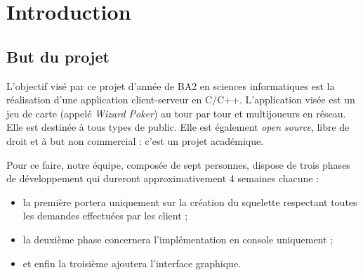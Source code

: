 \documentclass{article}
\begin{document}
\tableofcontents
\newpage
{}

\section{Introduction}
	\subsection{But du projet}
		L'objectif visé par ce projet d'année de BA2 en sciences informatiques est la réalisation d'une application client-serveur en C/C++. L'application visée est
		un jeu de carte (appelé \textit{Wizard Poker}) au tour par tour et multijoueurs en réseau. Elle est destinée à tous types de public. Elle est également
		\textit{open source}, libre de droit et à but non commercial : c'est un projet académique.

		Pour ce faire, notre équipe, composée de sept personnes, dispose de trois phases de développement qui dureront approximativement 4 semaines chacune :
		\begin{itemize}
			\item la première portera uniquement sur la création du squelette respectant toutes les demandes effectuées par les client ;
			\item la deuxième phase concernera l'implémentation en console uniquement ;
			\item et enfin la troisième ajoutera l'interface graphique.
		\end{itemize}
\end{document}
